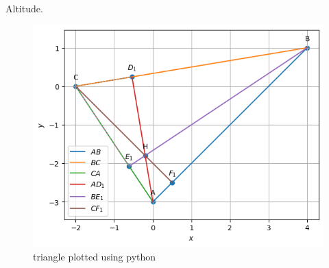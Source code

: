 \begin{table}[H]
        \centering
        
        \caption{Altitude.}
        \label{tab:altitude}
    \end{table}
\begin{figure}[H]
	\includegraphics[width=\columnwidth]{altitude/figs/altitude.png}
\caption{triangle plotted using python}
\label{fig:i_altitude_py}
\end{figure}

